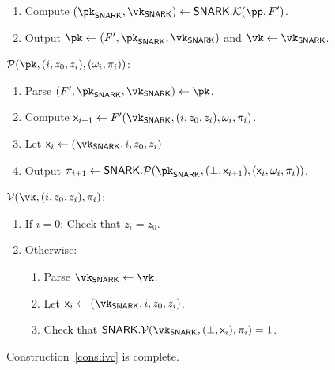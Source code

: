 \begin{construction}
\begin{mdframed}[nobreak=true]
\begin{enumerate}
       \item Compute 
       $(\pk_\snark, \vk_\snark) \gets \snark.\En(\pp, \FP)$.
       \item Output $\pk \gets (\FP, \pk_\snark, \vk_\snark)$ and $\vk \gets \vk_\snark$.
     \end{enumerate}
   \end{mdframed}
   \begin{mdframed}[nobreak=true]
     \underline{$\Po(\pk, (i, z_0, z_i), (\omega_i, \pi_i))$}:
     \begin{enumerate} 
       \item Parse $(\FP, \pk_\snark, \vk_\snark) \gets \pk$.
       \item Compute
       $\io_{i + 1} \gets \FP(\vk_{\snark},
       (i, z_0, z_i), \omega_i, \pi_i)$.
       \item Let $\io_i \gets (\vk_{\snark}, i, z_0, z_i)$
       \label{ivc:prover:io}
       \item Output
       $
       \pi_{i + 1} \gets \snark.\Po(\pk_\snark, (\bot, \io_{i + 1}), (\io_i
       , \omega_i, \pi_i))
       $.
       \label{ivc:prover:proof}
     \end{enumerate} 
   \end{mdframed}
   \begin{mdframed}[nobreak=true]
     \underline{$\V(\vk, (i, z_0, z_i), \pi_i)$}:
     \begin{enumerate}
       \item If $i = 0$: Check that $z_i = z_0$.
       \label{ivc:verifier:base}
       \item Otherwise:
       \begin{enumerate}
         \item Parse $\vk_{\snark} \gets \vk$.
         \item Let $\io_i \gets (\vk_\snark, i, z_0, z_i)$.
         \label{ivc:v:check:first}
         \item Check that
         $\snark.\V(\vk_\snark, (\bot, \io_i), \pi_i) = 1$.
         \label{ivc:v:check:second}
       \end{enumerate}
       
     \end{enumerate}
   \end{mdframed}
 \end{construction}

\begin{lemma}[Completeness]
 Construction~\ref{cons:ivc}
 is complete.
\end{lemma}

